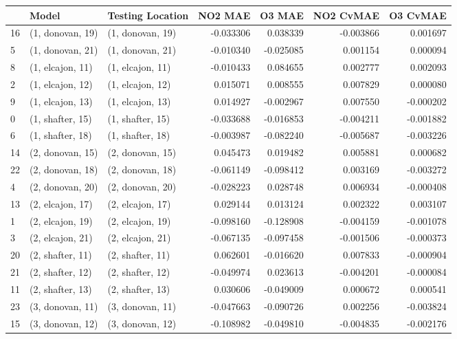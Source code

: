 \begin{tabular}{lllrrrr}
\toprule
{} &             Model &  Testing Location &   NO2 MAE &    O3 MAE &  NO2 CvMAE &  O3 CvMAE \\
\midrule
16 &  (1, donovan, 19) &  (1, donovan, 19) & -0.033306 &  0.038339 &  -0.003866 &  0.001697 \\
5  &  (1, donovan, 21) &  (1, donovan, 21) & -0.010340 & -0.025085 &   0.001154 &  0.000094 \\
8  &  (1, elcajon, 11) &  (1, elcajon, 11) & -0.010433 &  0.084655 &   0.002777 &  0.002093 \\
2  &  (1, elcajon, 12) &  (1, elcajon, 12) &  0.015071 &  0.008555 &   0.007829 &  0.000080 \\
9  &  (1, elcajon, 13) &  (1, elcajon, 13) &  0.014927 & -0.002967 &   0.007550 & -0.000202 \\
0  &  (1, shafter, 15) &  (1, shafter, 15) & -0.033688 & -0.016853 &  -0.004211 & -0.001882 \\
6  &  (1, shafter, 18) &  (1, shafter, 18) & -0.003987 & -0.082240 &  -0.005687 & -0.003226 \\
14 &  (2, donovan, 15) &  (2, donovan, 15) &  0.045473 &  0.019482 &   0.005881 &  0.000682 \\
22 &  (2, donovan, 18) &  (2, donovan, 18) & -0.061149 & -0.098412 &   0.003169 & -0.003272 \\
4  &  (2, donovan, 20) &  (2, donovan, 20) & -0.028223 &  0.028748 &   0.006934 & -0.000408 \\
13 &  (2, elcajon, 17) &  (2, elcajon, 17) &  0.029144 &  0.013124 &   0.002322 &  0.003107 \\
1  &  (2, elcajon, 19) &  (2, elcajon, 19) & -0.098160 & -0.128908 &  -0.004159 & -0.001078 \\
3  &  (2, elcajon, 21) &  (2, elcajon, 21) & -0.067135 & -0.097458 &  -0.001506 & -0.000373 \\
20 &  (2, shafter, 11) &  (2, shafter, 11) &  0.062601 & -0.016620 &   0.007833 & -0.000904 \\
21 &  (2, shafter, 12) &  (2, shafter, 12) & -0.049974 &  0.023613 &  -0.004201 & -0.000084 \\
11 &  (2, shafter, 13) &  (2, shafter, 13) &  0.030606 & -0.049009 &   0.000672 &  0.000541 \\
23 &  (3, donovan, 11) &  (3, donovan, 11) & -0.047663 & -0.090726 &   0.002256 & -0.003824 \\
15 &  (3, donovan, 12) &  (3, donovan, 12) & -0.108982 & -0.049810 &  -0.004835 & -0.002176 \\

\end{tabular}
